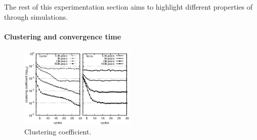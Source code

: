The rest of this experimentation section aims to highlight different properties
of \SPRAY through simulations.

\paragraph{Clustering and convergence time}

\begin{figure}
  \centering
  \includegraphics[width=0.49\textwidth]{img/simple.eps}
  \caption{\label{fig:clustering}Clustering coefficient.}
\end{figure}

